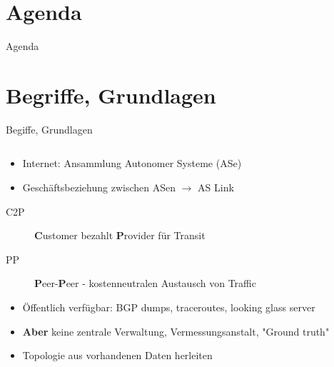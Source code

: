 \documentclass[ngerman,compress,hyperref={bookmarks}]{beamer}
\begin{document}
\section*{Agenda}
\begin{frame}{Agenda} \setcounter{tocdepth}{1} \tableofcontents[part=1] \setcounter{tocdepth}{3} \end{frame}

\section{Begriffe, Grundlagen}
\begin{frame}{Begiffe, Grundlagen}
  \begin{columns}[c]
    \begin{column}{0.75\textwidth}
      \begin{itemize}
        \item Internet: Ansammlung Autonomer Systeme (ASe)
        \item Geschäftsbeziehung zwischen ASen $\rightarrow$ AS Link
      \end{itemize}
      \begin{description}
        \item[C2P] \textbf{C}ustomer bezahlt \textbf{P}rovider für Transit
        \item[PP] \textbf{P}eer-\textbf{P}eer - kostenneutralen Austausch von Traffic
      \end{description}
      \begin{itemize}
        \item Öffentlich verfügbar: BGP dumps, traceroutes, looking glass server
        \item \textbf{Aber} keine zentrale Verwaltung, Vermessungsanstalt, "Ground truth"
        \item Topologie aus vorhandenen Daten herleiten
      \end{itemize}
    \end{column}
  \end{columns}
\end{frame}
\end{document}
